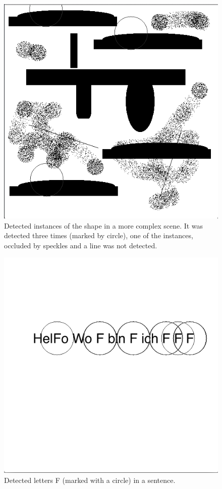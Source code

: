 \documentclass[11pt,a4paper]{article}
\begin{document}
\begin{figure}
\centering
\includegraphics[scale=.4]{img/matchShape.png}

\caption{Detected instances of the shape in a more complex scene. It was detected three times (marked by circle), one of the instances, occluded by speckles and a line was not detected.  }
\label{fig:6}
\end{figure}

\begin{figure}
\centering
\includegraphics[scale=.4]{img/matchLetter.png}

\caption{Detected letters F (marked with a circle) in a sentence. }
\label{fig:7}
\end{figure}
\end{document}
